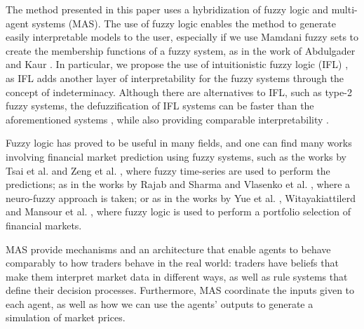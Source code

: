 \documentclass{ieeeaccess}
\begin{document}
The method presented in this paper uses a hybridization of fuzzy logic
and multi-agent systems (MAS). The use of fuzzy logic enables
the method to generate easily interpretable models to the user,
especially if we use Mamdani fuzzy sets \cite{Mamdani1975} 
to create the membership functions of a fuzzy system, as in the
work of Abdulgader and Kaur \cite{Abdulgader2019}. 
In particular, we propose the use of intuitionistic fuzzy logic (IFL)
\cite{Atanassov1986} \cite{Atanassov2003}, as IFL adds another layer
of interpretability for the fuzzy systems through the concept of
indeterminacy. Although there are alternatives to IFL, such as type-2
fuzzy systems, the defuzzification of IFL systems can be faster than
the aforementioned systems \cite{Hernandez-Aguila2017-2}, while also
providing comparable interpretability \cite{Hernandez-Aguila2016} \cite{castillo2019comments} .

Fuzzy logic has proved to be useful in many fields, and one can find
many works involving financial market prediction using fuzzy systems,
such as the works by Tsai et al. \cite{Tsai2019} and Zeng et
al. \cite{Zeng2019}, where fuzzy time-series are used to perform the
predictions; as in the works by Rajab and Sharma \cite{Rajab2019} and
Vlasenko et al. \cite{Vlasenko2019}, where a neuro-fuzzy approach is
taken; or as in the works by Yue et al. \cite{Yue2019},
Witayakiattilerd \cite{Witayakiattilerd2019} and Mansour et
al. \cite{Mansour2019}, where fuzzy logic is used to perform a
portfolio selection of financial markets.

MAS provide mechanisms and an architecture that enable agents to
behave comparably to how traders behave in the real world: traders have
beliefs that make them interpret market data in different ways, as
well as rule systems that define their decision
processes. Furthermore, MAS coordinate the inputs given to each agent,
as well as how we can use the agents' outputs to generate a simulation
of market prices.
\end{document}
